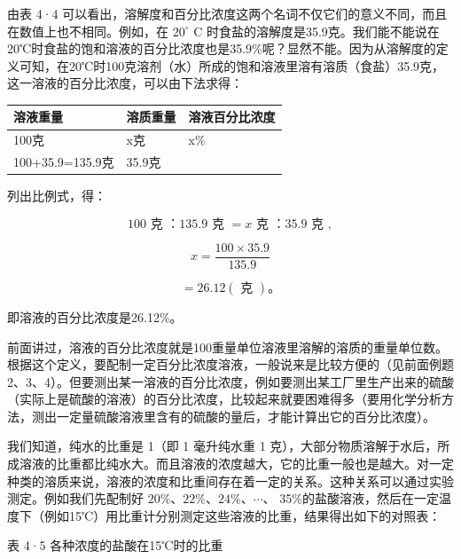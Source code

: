 由表 4·4
可以看出，溶解度和百分比浓度这两个名词不仅它们的意义不同，而且在数值上也不相同。例如，在
\(20^{\circ}\) C
时食盐的溶解度是35.9克。我们能不能说在20℃时食盐的饱和溶液的百分比浓度也是35.9\%呢？显然不能。因为从溶解度的定义可知，在20℃时100克溶剂（水）所成的饱和溶液里溶有溶质（食盐）35.9克，这一溶液的百分比浓度，可以由下法求得：

{\def\LTcaptype{none} %
\begin{longtable}[]{@{}lll@{}}
\toprule\noalign{}
溶液重量 & 溶质重量 & 溶液百分比浓度 \\
\midrule\noalign{}
\endhead
\bottomrule\noalign{}
\endlastfoot
100克 & x克 & x\% \\
100+35.9=135.9克 & 35.9克 & \\
\end{longtable}
}

列出比例式，得：

\[
100 \text{ 克 }\text{：} 135.9 \text{ 克 } = x \text{ 克 }\text{：} 35.9 \text{ 克 },
\]

\[
x = \frac {100 \times 35.9}{135.9}
\]

\[
= 26.12 (\text{ 克 })\text{。}
\]

即溶液的百分比浓度是26.12\%。

前面讲过，溶液的百分比浓度就是100重量单位溶液里溶解的溶质的重量单位数。根据这个定义，要配制一定百分比浓度溶液，一般说来是比较方便的（见前面例题2、3、4）。但要测出某一溶液的百分比浓度，例如要测出某工厂里生产出来的硫酸（实际上是硫酸的溶液）的百分比浓度，比较起来就要困难得多（要用化学分析方法，测出一定量硫酸溶液里含有的硫酸的量后，才能计算出它的百分比浓度）。

我们知道，纯水的比重是 1（即 1 毫升纯水重 1
克），大部分物质溶解于水后，所成溶液的比重都比纯水大。而且溶液的浓度越大，它的比重一般也是越大。对一定种类的溶质来说，溶液的浓度和比重间存在着一定的关系。这种关系可以通过实验测定。例如我们先配制好
\(20\%\)、\(22\%\)、\(24\%\)、\(\cdots\)、
35\%的盐酸溶液，然后在一定温度下（例如15℃）用比重计分别测定这些溶液的比重，结果得出如下的对照表：

表 4·5 各种浓度的盐酸在15℃时的比重

{\centering
\footnotesize\setlength{\tabcolsep}{2.6pt}%
\par
}

